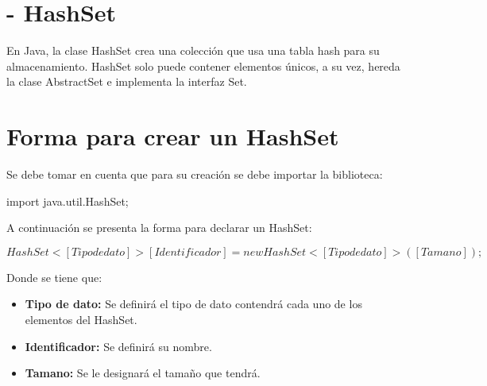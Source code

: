 \documentclass[12pt, letterpaper]{article} %
\begin{document}
\section*{- HashSet}
En Java, la clase HashSet crea una colección que usa una tabla hash para su almacenamiento. HashSet solo puede contener elementos únicos, a su vez, hereda la clase AbstractSet e implementa la interfaz Set.
\vspace{15mm}

\section*{Forma para crear un HashSet}
Se debe tomar en cuenta que para su creación se debe importar la biblioteca:
\begin{center}
    import java.util.HashSet;
\end{center}
A continuación se presenta la forma para declarar un HashSet:
\begin{center}
   $HashSet<[Tipo de dato]> [Identificador] = new HashSet<[Tipo de dato]>([Tamano]);$ 
\end{center}
Donde se tiene que:
\begin{itemize}
    \item \textbf{Tipo de dato:} Se definirá el tipo de dato contendrá cada uno de los elementos del HashSet.
    \item \textbf{Identificador:} Se definirá su nombre.
    \item \textbf{Tamano:} Se le designará el tamaño que tendrá.
\end{itemize}
\end{document}
